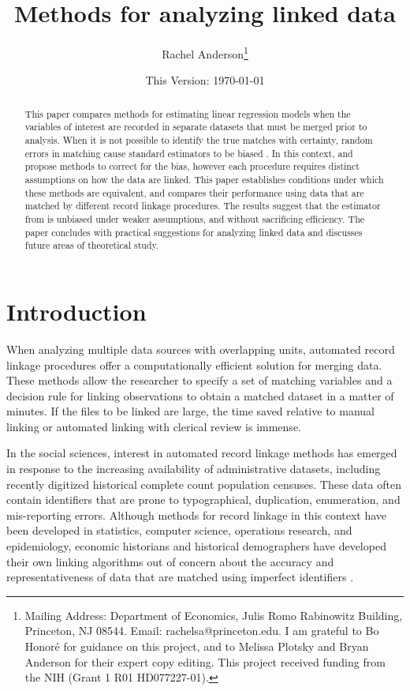\documentclass[12pt]{article}
\title{\singlespacing Methods for analyzing linked data}
\author{Rachel Anderson\thanks{Mailing Address: Department of Economics, Julis Romo Rabinowitz Building,
Princeton, NJ 08544. Email: rachelsa@princeton.edu.  I am grateful to Bo Honor\'e for guidance on this project, and to Melissa Plotsky and Bryan Anderson for their expert copy editing.  This project received funding from the NIH (Grant 1 R01 HD077227-01). }}
\date{This Version: \today}
\begin{document}
\maketitle

\begin{abstract}
\singlespacing
\noindent This paper compares methods for estimating linear regression models when the variables of interest are recorded in separate datasets that must be merged prior to analysis.  When it is not possible to identify the true matches with certainty, random errors in matching cause standard estimators to be biased \citep*{NeterMaynes}.  
In this context, \cite{sw1993} and \cite*{ahl2019} propose methods to correct for the bias, however each procedure requires distinct assumptions on how the data are linked.  This paper establishes conditions under which these methods are equivalent, and compares their performance using data that are matched by different record linkage procedures.  The results suggest that the estimator from \citet*{ahl2019} is unbiased under weaker assumptions, and without sacrificing efficiency.  The paper concludes with practical suggestions for analyzing linked data and discusses future areas of theoretical study. \end{abstract}
\newpage

\section{Introduction}

When analyzing multiple data sources with overlapping units, automated record linkage procedures offer a computationally efficient solution for merging data.  These methods allow the researcher to specify a set of matching variables and a decision rule for linking observations to obtain a matched dataset in a matter of minutes.  If the files to be linked are large, the time saved relative to manual linking or automated linking with clerical review is immense. 

In the social sciences, interest in automated record linkage methods has emerged in response to the increasing availability of administrative datasets, including recently digitized historical complete count population censuses.  These data often contain identifiers that are prone to typographical, duplication, enumeration, and mis-reporting errors.  Although methods for record linkage in this context have been developed in statistics, computer science, operations research, and epidemiology, economic historians and historical demographers have developed their own linking algorithms out of concern about the accuracy and representativeness of data that are matched using imperfect identifiers \citep*{ferrie96, abe2012, abe2014, abe2019b}.
\end{document}
